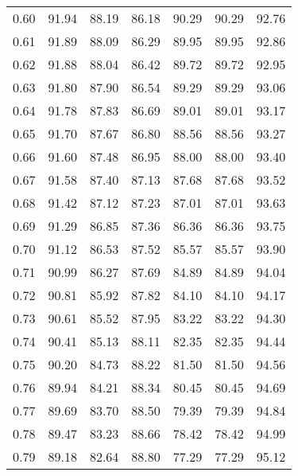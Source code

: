 \begin{tabular}{|c|c|c|c|c|c|c|}
      0.60 &     91.94 &     88.19 &      86.18 &   90.29 &      90.29 &         92.76 \\
      0.61 &     91.89 &     88.09 &      86.29 &   89.95 &      89.95 &         92.86 \\
      0.62 &     91.88 &     88.04 &      86.42 &   89.72 &      89.72 &         92.95 \\
      0.63 &     91.80 &     87.90 &      86.54 &   89.29 &      89.29 &         93.06 \\
      0.64 &     91.78 &     87.83 &      86.69 &   89.01 &      89.01 &         93.17 \\
      0.65 &     91.70 &     87.67 &      86.80 &   88.56 &      88.56 &         93.27 \\
      0.66 &     91.60 &     87.48 &      86.95 &   88.00 &      88.00 &         93.40 \\
      0.67 &     91.58 &     87.40 &      87.13 &   87.68 &      87.68 &         93.52 \\
      0.68 &     91.42 &     87.12 &      87.23 &   87.01 &      87.01 &         93.63 \\
      0.69 &     91.29 &     86.85 &      87.36 &   86.36 &      86.36 &         93.75 \\
      0.70 &     91.12 &     86.53 &      87.52 &   85.57 &      85.57 &         93.90 \\
      0.71 &     90.99 &     86.27 &      87.69 &   84.89 &      84.89 &         94.04 \\
      0.72 &     90.81 &     85.92 &      87.82 &   84.10 &      84.10 &         94.17 \\
      0.73 &     90.61 &     85.52 &      87.95 &   83.22 &      83.22 &         94.30 \\
      0.74 &     90.41 &     85.13 &      88.11 &   82.35 &      82.35 &         94.44 \\
      0.75 &     90.20 &     84.73 &      88.22 &   81.50 &      81.50 &         94.56 \\
      0.76 &     89.94 &     84.21 &      88.34 &   80.45 &      80.45 &         94.69 \\
      0.77 &     89.69 &     83.70 &      88.50 &   79.39 &      79.39 &         94.84 \\
      0.78 &     89.47 &     83.23 &      88.66 &   78.42 &      78.42 &         94.99 \\
      0.79 &     89.18 &     82.64 &      88.80 &   77.29 &      77.29 &         95.12 \\

\end{tabular}
